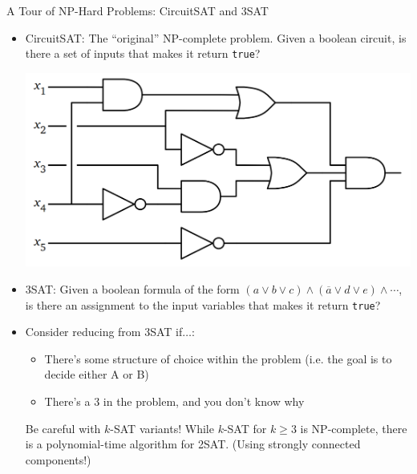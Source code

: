 \documentclass{beamer}
\begin{document}
\begin{frame}[t]{A Tour of NP-Hard Problems: CircuitSAT and 3SAT}
    \begin{itemize}
        \item \alert{CircuitSAT}: The ``original'' NP-complete problem. Given a boolean circuit, is there a set of inputs that makes it return \texttt{true}?
            \begin{center}
                \includegraphics[height=.2\textwidth]{csat.PNG}
            \end{center}
        \item \pause \alert{3SAT}: Given a boolean formula of the form $(a \vee b \vee c) \wedge (\overline{a} \vee d \vee e) \wedge \dotsb$, is there an assignment to the input variables that makes it return \texttt{true}?
        \item \pause Consider reducing from 3SAT if$\dotsc$:
        \begin{itemize}
            \item \pause There's some structure of choice within the problem (i.e. the goal is to decide either A or B)
            \item  \pause There's a 3 in the problem, and you don't know why
        \end{itemize}
        \pause
        \begin{alertblock}{Be careful with $k$-SAT variants!}
            While $k$-SAT for $k \geq 3$ is NP-complete, there is a polynomial-time algorithm for 2SAT. (Using strongly connected components!)
        \end{alertblock}
    \end{itemize}
\end{frame}
\end{document}
